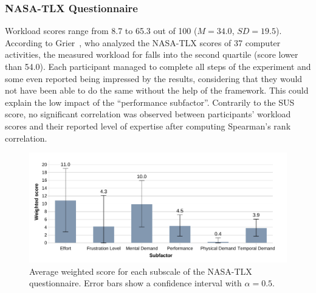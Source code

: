 \subsubsection{NASA-TLX Questionnaire}
Workload scores range from 8.7 to 65.3 out of 100 ($M{=}34.0$, $SD{=}19.5$). According to Grier~\cite{Grier:2015}, who analyzed the NASA-TLX scores of 37 computer activities, the measured workload for \ql falls into the second quartile (score lower than 54.0). Each participant managed to complete all steps of the experiment and some even reported being impressed by the results, considering that they would not have been able to do the same without the help of the framework. This could explain the low impact of the ``performance subfactor''. 
 Contrarily to the SUS score, no significant correlation was observed between participants' workload scores and their reported level of expertise after computing Spearman's rank correlation.

\begin{figure}[t]
    \centering
    \includegraphics[width=\linewidth]{Figures/QuantumLeap/Evaluation/NASA-TLX-scores.pdf}
    \vspace{-16pt}
    \caption{Average weighted score for each subscale of the NASA-TLX questionnaire. Error bars show a confidence interval with $\alpha{=}0.5$.}
    \label{fig:quantumleap:nasa-tlx-scores}
\end{figure}

